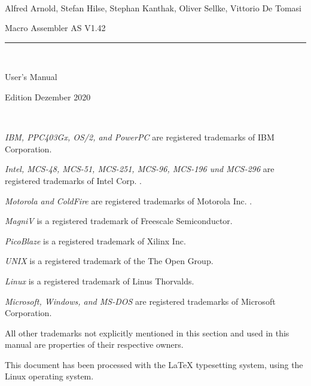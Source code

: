 \documentclass[12pt,twoside]{report}
\begin{document}
\thispagestyle{empty}

\
\vspace{7cm}\par

\begin{raggedright}
{\large Alfred Arnold, Stefan Hilse, Stephan Kanthak, Oliver
 Sellke, Vittorio De Tomasi}
\vspace{1cm}\par
{\huge Macro Assembler AS V1.42}\\
\rule{9.5cm}{0.3mm}\\
\vspace{2mm}\par
{\huge User's Manual}

\vspace{1cm}\par

{\large Edition Dezember 2020}
\end{raggedright}

\clearpage
\thispagestyle{empty}

\ \vspace{5cm}

{\em IBM, PPC403Gx, OS/2, and PowerPC} are registered trademarks of IBM
Corporation.

{\em Intel, MCS-48, MCS-51, MCS-251, MCS-96, MCS-196 und MCS-296} are
registered trademarks of Intel Corp. .

{\em Motorola and ColdFire} are registered trademarks of Motorola Inc. .

{\em MagniV} is a registered trademark of Freescale Semiconductor.

{\em PicoBlaze} is a registered trademark of Xilinx Inc.

{\em UNIX} is a registered trademark of the The Open Group.

{\em Linux} is a registered trademark of Linus Thorvalds.

{\em Microsoft, Windows, and MS-DOS} are registered trademarks of
Microsoft Corporation.

All other trademarks not explicitly mentioned in this section and used in
this manual are properties of their respective owners.

\vspace{5cm}

This document has been processed with the LaTeX typesetting system, using
the Linux operating system.

\clearpage

\end{document}
